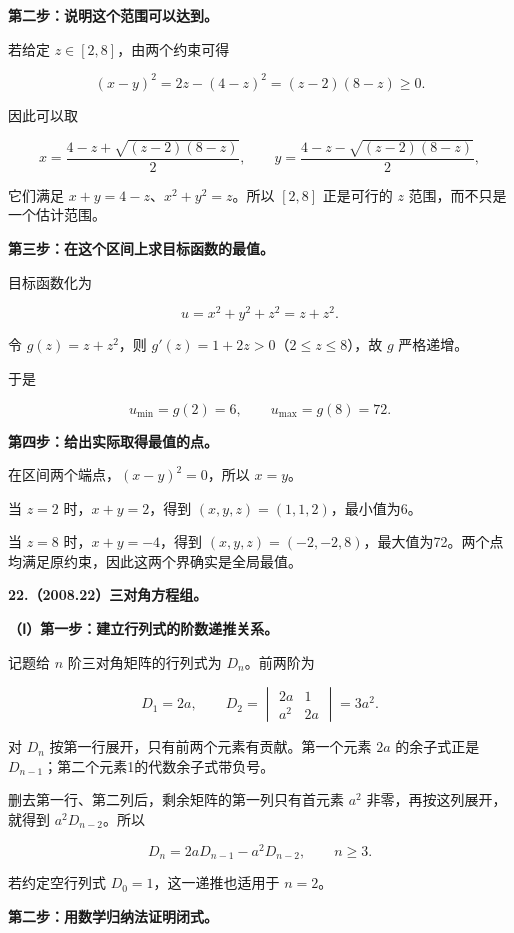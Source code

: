 \documentclass[UTF8,11pt,fontset=windows]{ctexart}
\begin{document}
\textbf{第二步：说明这个范围可以达到。}

若给定 $z\in[2,8]$，由两个约束可得

$$
(x-y)^2=2z-(4-z)^2=(z-2)(8-z)\ge0.
$$

因此可以取

$$
x=\frac{4-z+\sqrt{(z-2)(8-z)}}2,
\qquad
y=\frac{4-z-\sqrt{(z-2)(8-z)}}2,
$$

它们满足 $x+y=4-z$、$x^2+y^2=z$。所以 $[2,8]$ 正是可行的 $z$ 范围，而不只是一个估计范围。

\textbf{第三步：在这个区间上求目标函数的最值。}

目标函数化为

$$
u=x^2+y^2+z^2=z+z^2.
$$

令 $g(z)=z+z^2$，则 $g'(z)=1+2z>0$（$2\le z\le8$），故 $g$ 严格递增。

于是

$$
\boxed{u_{\min}=g(2)=6},
\qquad\boxed{u_{\max}=g(8)=72}.
$$

\textbf{第四步：给出实际取得最值的点。}

在区间两个端点，$(x-y)^2=0$，所以 $x=y$。

当 $z=2$ 时，$x+y=2$，得到 $(x,y,z)=(1,1,2)$，最小值为6。

当 $z=8$ 时，$x+y=-4$，得到 $(x,y,z)=(-2,-2,8)$，最大值为72。两个点均满足原约束，因此这两个界确实是全局最值。

\clearpage

\textbf{22.（2008.22）三对角方程组。}

\textbf{（Ⅰ）第一步：建立行列式的阶数递推关系。}

记题给 $n$ 阶三对角矩阵的行列式为 $D_n$。前两阶为

$$
D_1=2a,\qquad D_2=\begin{vmatrix}2a&1\\a^2&2a\end{vmatrix}=3a^2.
$$

对 $D_n$ 按第一行展开，只有前两个元素有贡献。第一个元素 $2a$ 的余子式正是 $D_{n-1}$；第二个元素1的代数余子式带负号。

删去第一行、第二列后，剩余矩阵的第一列只有首元素 $a^2$ 非零，再按这列展开，就得到 $a^2D_{n-2}$。所以

$$
\boxed{D_n=2aD_{n-1}-a^2D_{n-2}},\qquad n\ge3.
$$

若约定空行列式 $D_0=1$，这一递推也适用于 $n=2$。

\textbf{第二步：用数学归纳法证明闭式。}
\end{document}

